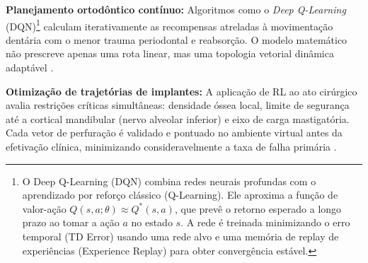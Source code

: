 \textbf{Planejamento ortodôntico contínuo:} Algoritmos como o \textit{Deep Q-Learning} (DQN)\footnote{O Deep Q-Learning (DQN) combina redes neurais profundas com o aprendizado por reforço clássico (Q-Learning). Ele aproxima a função de valor-ação $Q(s, a; \theta) \approx Q^*(s, a)$, que prevê o retorno esperado a longo prazo ao tomar a ação $a$ no estado $s$. A rede é treinada minimizando o erro temporal (TD Error) usando uma rede alvo e uma memória de replay de experiências (Experience Replay) para obter convergência estável.} calculam iterativamente as recompensas atreladas à movimentação dentária com o menor trauma periodontal e reabsorção. O modelo matemático não prescreve apenas uma rota linear, mas uma topologia vetorial dinâmica adaptável \cite{zhang2024recursive}.

\textbf{Otimização de trajetórias de implantes:} A aplicação de RL ao ato cirúrgico avalia restrições críticas simultâneas: densidade óssea local, limite de segurança até a cortical mandibular (nervo alveolar inferior) e eixo de carga mastigatória. Cada vetor de perfuração é validado e pontuado no ambiente virtual antes da efetivação clínica, minimizando consideravelmente a taxa de falha primária \cite{alshadidi2024}.
